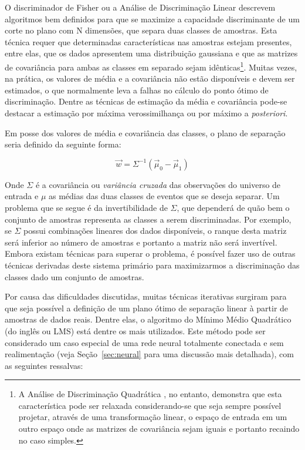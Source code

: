 O discriminador de Fisher \cite{fisher} ou a Análise de Discriminação Linear
\cite{duda} descrevem algoritmos bem definidos para que se maximize a
capacidade discriminante de um corte no plano com N dimensões, que separa duas
classes de amostras. Esta técnica requer que determinadas características nas
amostras estejam presentes, entre elas, que os dados apresentem uma
distribuição gaussiana e que as matrizes de covariância para ambas as classes
em separado sejam idênticas\footnote{A Análise de Discriminação Quadrática
\cite{duda}, no entanto, demonstra que esta característica pode ser relaxada
considerando-se que seja sempre possível projetar, através de uma
transformação linear, o espaço de entrada em um outro espaço onde as matrizes
de covariância sejam iguais e portanto recaindo no caso simples.}. Muitas
vezes, na prática, os valores de média e a covariância não estão disponíveis e
devem ser estimados, o que normalmente leva a falhas no cálculo do ponto ótimo
de discriminação. Dentre as técnicas de estimação da média e covariância
pode-se destacar a estimação por máxima verossimilhança ou por máximo a
\textit{posteriori}.

Em posse dos valores de média e covariância das classes, o plano de separação
seria definido da seguinte forma:

\begin{equation}
\overrightarrow{w} = \Sigma^{-1}(\overrightarrow{\mu}_0 -
\overrightarrow{\mu}_1) 
\end{equation}

Onde $\Sigma$ é a covariância ou \textit{variância cruzada} das observações do
universo de entrada e $\mu$ as médias das duas classes de eventos que se
deseja separar. Um problema que se segue é da invertibilidade de $\Sigma$, que
dependerá de quão bem o conjunto de amostras representa as classes a serem
discriminadas. Por exemplo, se $\Sigma$ possui combinações lineares dos dados
disponíveis, o ranque desta matriz será inferior ao número de amostras e
portanto a matriz não será invertível. Embora existam técnicas para superar o
problema, é possível fazer uso de outras técnicas derivadas deste sistema
primário para maximizarmos a discriminação das classes dado um conjunto de
amostras.

Por causa das dificuldades discutidas, muitas técnicas iterativas surgiram
para que seja possível a definição de um plano ótimo de separação linear à
partir de amostras de dados reais. Dentre elas, o algoritmo do Mínimo Médio
Quadrático \cite{widrow} (do inglês  ou LMS) está
dentre os mais utilizados. Este método pode ser considerado um caso especial
de uma rede neural totalmente conectada e sem realimentação (veja
Seção~\ref{sec:neural} para uma discussão mais detalhada), com as seguintes
ressalvas:

